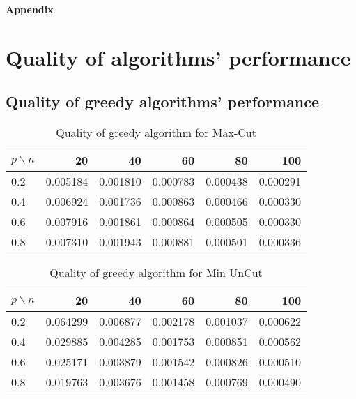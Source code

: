 \documentclass[12pt]{article}
\begin{document}
\vspace{1in}
\appendix
{\Large\bfseries Appendix}

\section{Quality of algorithms' performance}\label{results}

\subsection{Quality of greedy algorithms' performance}

\begin{table}[H]
	\centering
	\begin{tabular}{|lrrrrr|}
		\toprule
		{$p \backslash n$} &       20  &       40  &       60  &       80  &       100 \\
		\midrule
		0.2 &  0.005184 &  0.001810 &  0.000783 &  0.000438 &  0.000291 \\
		0.4 &  0.006924 &  0.001736 &  0.000863 &  0.000466 &  0.000330 \\
		0.6 &  0.007916 &  0.001861 &  0.000864 &  0.000505 &  0.000330 \\
		0.8 &  0.007310 &  0.001943 &  0.000881 &  0.000501 &  0.000336 \\
		\bottomrule
	\end{tabular}
	\caption{Quality of greedy algorithm for Max-Cut}
\end{table}


\begin{table}[H]
	\centering
	\begin{tabular}{|lrrrrr|}
		\toprule
		{$p \backslash n$} &       20  &       40  &       60  &       80  &       100 \\
		\midrule
		0.2 &  0.064299 &  0.006877 &  0.002178 &  0.001037 &  0.000622 \\
		0.4 &  0.029885 &  0.004285 &  0.001753 &  0.000851 &  0.000562 \\
		0.6 &  0.025171 &  0.003879 &  0.001542 &  0.000826 &  0.000510 \\
		0.8 &  0.019763 &  0.003676 &  0.001458 &  0.000769 &  0.000490 \\
		\bottomrule
	\end{tabular}
	\caption{Quality of greedy algorithm for Min UnCut}
\end{table}
\end{document}
